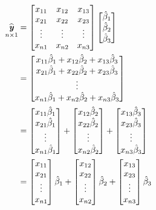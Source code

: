 \documentclass[12pt]{report}
\begin{document}
\begin{align*}
\underset{n\times1}{\widehat{\textbf{\textit{y}}}}
	&=
	\begin{bmatrix}
	x_{11} & x_{12} & x_{13} \\
	x_{21} & x_{22} & x_{23} \\
	\vdots & \vdots & \vdots \\
	x_{n1} & x_{n2} & x_{n3} 
	\end{bmatrix}
	\begin{bmatrix}
	\hat{\beta}_1 \\
	\hat{\beta}_2 \\
	\hat{\beta}_3 
	\end{bmatrix} \\
	&=
	\begin{bmatrix}
	x_{11}\hat{\beta}_1+x_{12}\hat{\beta}_2+	x_{13}\hat{\beta}_3 \\
	x_{21}\hat{\beta}_1+x_{22}\hat{\beta}_2+	x_{23}\hat{\beta}_3 \\
	\vdots \\
	x_{n1}\hat{\beta}_1+x_{n2}\hat{\beta}_2+	x_{n3}\hat{\beta}_3 
	\end{bmatrix} \\
	&=
	\begin{bmatrix}
	x_{11}\hat{\beta}_1 \\
	x_{21}\hat{\beta}_1 \\
	\vdots \\
	x_{n1}\hat{\beta}_1 
	\end{bmatrix}
	+
	\begin{bmatrix}
	x_{12}\hat{\beta}_2 \\
	x_{22}\hat{\beta}_2 \\
	\vdots \\
	x_{n2}\hat{\beta}_2 
	\end{bmatrix}
	+
	\begin{bmatrix}
	x_{13}\hat{\beta}_3 \\
	x_{23}\hat{\beta}_3 \\
	\vdots \\
	x_{n3}\hat{\beta}_3 
	\end{bmatrix} \\
	&=
	\begin{bmatrix}
	x_{11} \\
	x_{21} \\
	\vdots \\
	x_{n1} 
	\end{bmatrix}
	\hat{\beta}_1
	+
	\begin{bmatrix}
	x_{12} \\
	x_{22} \\
	\vdots \\
	x_{n2} 
	\end{bmatrix}
	\hat{\beta}_2
	+
	\begin{bmatrix}
	x_{13} \\
	x_{23} \\
	\vdots \\
	x_{n3} 
	\end{bmatrix}
	\hat{\beta}_3
\end{align*}
\end{document}
